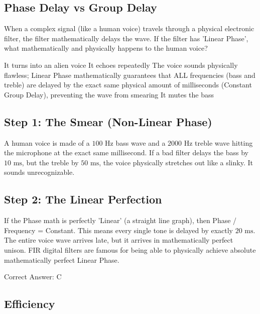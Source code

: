 \clearpage

\subsection{Phase Delay vs Group Delay}

When a complex signal (like a human voice) travels through a physical electronic filter, the filter mathematically delays the wave. If the filter has 'Linear Phase', what mathematically and physically happens to the human voice?

\begin{choices}
    \choice It turns into an alien voice
    \choice It echoes repeatedly
    \correctchoice The voice sounds physically flawless; Linear Phase mathematically guarantees that ALL frequencies (bass and treble) are delayed by the exact same physical amount of milliseconds (Constant Group Delay), preventing the wave from smearing
    \choice It mutes the bass
\end{choices}

\begin{solution}

\subsection*{Step 1: The Smear (Non-Linear Phase)}
A human voice is made of a $100\text{ Hz}$ bass wave and a $2000\text{ Hz}$ treble wave hitting the microphone at the exact same millisecond. If a bad filter delays the bass by $10\text{ ms}$, but the treble by $50\text{ ms}$, the voice physically stretches out like a slinky. It sounds unrecognizable.

\subsection*{Step 2: The Linear Perfection}
If the Phase math is perfectly 'Linear' (a straight line graph), then Phase / Frequency = Constant. This means every single tone is delayed by exactly $20\text{ ms}$. The entire voice wave arrives late, but it arrives in mathematically perfect unison. FIR digital filters are famous for being able to physically achieve absolute mathematically perfect Linear Phase.

Correct Answer: C
\end{solution}

\clearpage

\subsection{Efficiency}

